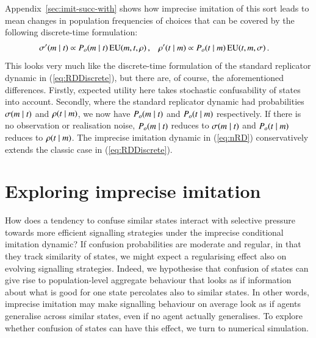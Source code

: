 \documentclass[12pt,english]{article}
\numberwithin{equation}{section}
\begin{document}
Appendix~\ref{sec:imit-succ-with} shows how imprecise imitation of this sort leads to mean changes in population
frequencies of choices that can be covered by the following discrete-time formulation:
\begin{align}
  \label{eq:nRD}
  \sigma'(m \mid t) & \propto P_o(m \mid t) \thinspace \mathrm{EU}(m,
  t, \rho)\,, & \rho'(t \mid m) & \propto P_o(t \mid m)
  \thinspace \mathrm{EU}(t, m, \sigma)\,.
\end{align}
\noindent This looks very much like the discrete-time formulation of the standard replicator
dynamic in (\ref{eq:RDDiscrete}), but there are, of course, the aforementioned
differences. Firstly, expected utility here takes stochastic confusability of states into
account. Secondly, where the standard replicator dynamic had probabilities
$\sigma(m \mid t)$ and $\rho(t \mid m)$, we now have
$P_o(m \mid t)$ and $P_o(t \mid m)$ respectively. If there is no
observation or realisation noise, $P_o(m \mid t)$ reduces to
$\sigma(m \mid t)$ and $P_o(t \mid m)$ reduces to
$\rho(t \mid m)$. The imprecise imitation dynamic in (\ref{eq:nRD})
conservatively extends the classic case in (\ref{eq:RDDiscrete}).







\section{Exploring imprecise imitation}
\label{sec:exploring-rdd}

How does a tendency to confuse similar states interact with selective pressure towards more
efficient signalling strategies under the imprecise conditional imitation dynamic? If confusion
probabilities are moderate and regular, in that they track similarity of states, we might
expect a regularising effect also on evolving signalling strategies. Indeed, we hypothesise
that confusion of states can give rise to population-level aggregate behaviour that looks as
if information about what is good for one state percolates also to similar states. In other
words, imprecise imitation may make signalling behaviour on average look as if agents
generalise across similar states, even if no agent actually generalises. To explore whether
confusion of states can have this effect, we turn to numerical simulation.
\end{document}
